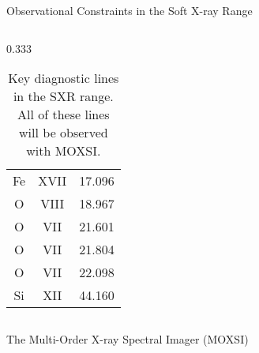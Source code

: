 \documentclass[final]{beamer}
\newlength{\colwidth}
\begin{document}
\begin{frame}[t]
\begin{columns}[t]
\begin{column}{\colwidth}
\begin{block}{Observational Constraints in the Soft X-ray Range}
\begin{columns}[c]
\begin{column}{0.333\colwidth}
\begin{table}
\begin{tabular}{ccc}
            Fe & XVII & 17.096 \\
            O & VIII & 18.967 \\
            O & VII & 21.601 \\
            O & VII & 21.804 \\
            O & VII & 22.098 \\
            Si & XII & 44.160 \\
            \bottomrule
          \end{tabular}
          \caption{Key diagnostic lines in the SXR range. All of these lines will be observed with MOXSI.}
          \label{tab:line_table}
        \end{table}
      \end{column}
    \end{columns}

  \end{block}

  \begin{block}{The Multi-Order X-ray Spectral Imager (MOXSI)}



\end{block}
\end{column}
\end{columns}
\end{frame}
\end{document}
